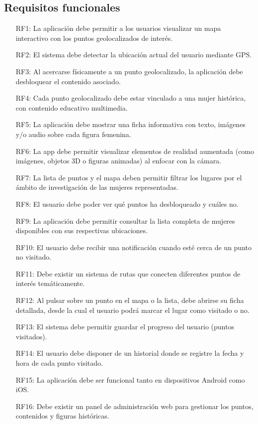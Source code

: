 \subsection{Requisitos funcionales}
\begin{itemize}
\item[RF1:] La aplicación debe permitir a los usuarios visualizar un mapa interactivo con los puntos geolocalizados de interés.
\item[RF2:] El sistema debe detectar la ubicación actual del usuario mediante GPS.
\item[RF3:] Al acercarse físicamente a un punto geolocalizado, la aplicación debe desbloquear el contenido asociado.
\item[RF4:] Cada punto geolocalizado debe estar vinculado a una mujer histórica, con contenido educativo multimedia.
\item[RF5:] La aplicación debe mostrar una ficha informativa con texto, imágenes y/o audio sobre cada figura femenina.
\item[RF6:] La app debe permitir visualizar elementos de realidad aumentada (como imágenes, objetos 3D o figuras animadas) al enfocar con la cámara.
\item[RF7:] La lista de puntos y el mapa deben permitir filtrar los lugares por el ámbito de investigación de las mujeres representadas.
\item[RF8:] El usuario debe poder ver qué puntos ha desbloqueado y cuáles no.
\item[RF9:] La aplicación debe permitir consultar la lista completa de mujeres disponibles con sus respectivas ubicaciones.
\item[RF10:] El usuario debe recibir una notificación cuando esté cerca de un punto no visitado.
\item[RF11:] Debe existir un sistema de rutas que conecten diferentes puntos de interés temáticamente.
\item[RF12:] Al pulsar sobre un punto en el mapa o la lista, debe abrirse su ficha detallada, desde la cual el usuario podrá marcar el lugar como visitado o no.
\item[RF13:] El sistema debe permitir guardar el progreso del usuario (puntos visitados).
\item[RF14:] El usuario debe disponer de un historial donde se registre la fecha y hora de cada punto visitado.
\item[RF15:] La aplicación debe ser funcional tanto en dispositivos Android como iOS.
\item[RF16:] Debe existir un panel de administración web para gestionar los puntos, contenidos y figuras históricas.

\end{itemize}
